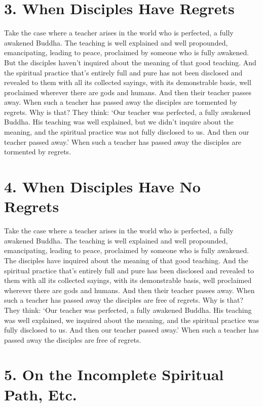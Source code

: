 \documentclass[12pt,openany]{book}%
\begin{document}
\section*{3. When Disciples Have Regrets }

Take the case where a teacher arises in the world who is perfected, a fully awakened Buddha. The teaching is well explained and well propounded, emancipating, leading to peace, proclaimed by someone who is fully awakened. But the disciples haven’t inquired about the meaning of that good teaching. And the spiritual practice that’s entirely full and pure has not been disclosed and revealed to them with all its collected sayings, with its demonstrable basis, well proclaimed wherever there are gods and humans. And then their teacher passes away. When such a teacher has passed away the disciples are tormented by regrets. Why is that? They think: ‘Our teacher was perfected, a fully awakened Buddha. His teaching was well explained, but we didn’t inquire about the meaning, and the spiritual practice was not fully disclosed to us. And then our teacher passed away.’ When such a teacher has passed away the disciples are tormented by regrets. 

\section*{4. When Disciples Have No Regrets }

Take the case where a teacher arises in the world who is perfected, a fully awakened Buddha. The teaching is well explained and well propounded, emancipating, leading to peace, proclaimed by someone who is fully awakened. The disciples have inquired about the meaning of that good teaching. And the spiritual practice that’s entirely full and pure has been disclosed and revealed to them with all its collected sayings, with its demonstrable basis, well proclaimed wherever there are gods and humans. And then their teacher passes away. When such a teacher has passed away the disciples are free of regrets. Why is that? They think: ‘Our teacher was perfected, a fully awakened Buddha. His teaching was well explained, we inquired about the meaning, and the spiritual practice was fully disclosed to us. And then our teacher passed away.’ When such a teacher has passed away the disciples are free of regrets. 

\section*{5. On the Incomplete Spiritual Path, Etc. }
\end{document}
